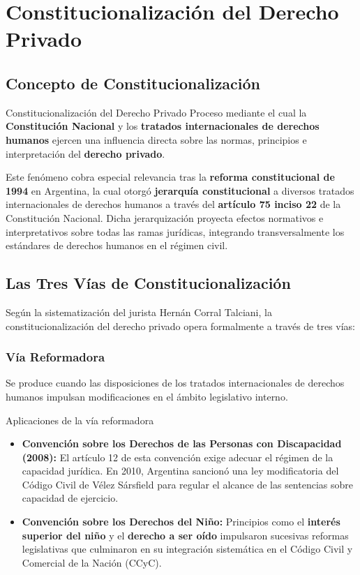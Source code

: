 \documentclass[12pt,oneside]{book}
\begin{document}
\chapter{Constitucionalización del Derecho Privado}

\section{Concepto de Constitucionalización}

\begin{definition}{Constitucionalización del Derecho Privado}
Proceso mediante el cual la \textbf{Constitución Nacional} y los \textbf{tratados internacionales de derechos humanos} ejercen una influencia directa sobre las normas, principios e interpretación del \textbf{derecho privado}.
\end{definition}

Este fenómeno cobra especial relevancia tras la \textbf{reforma constitucional de 1994} en Argentina, la cual otorgó \textbf{jerarquía constitucional} a diversos tratados internacionales de derechos humanos a través del \textbf{artículo 75 inciso 22} de la Constitución Nacional. Dicha jerarquización proyecta efectos normativos e interpretativos sobre todas las ramas jurídicas, integrando transversalmente los estándares de derechos humanos en el régimen civil.

\section{Las Tres Vías de Constitucionalización}

Según la sistematización del jurista Hernán Corral Talciani, la constitucionalización del derecho privado opera formalmente a través de tres vías:

\subsection{Vía Reformadora}
Se produce cuando las disposiciones de los tratados internacionales de derechos humanos impulsan modificaciones en el ámbito legislativo interno.

\begin{example}{Aplicaciones de la vía reformadora}
\begin{itemize}
    \item \textbf{Convención sobre los Derechos de las Personas con Discapacidad (2008):} El artículo 12 de esta convención exige adecuar el régimen de la capacidad jurídica. En 2010, Argentina sancionó una ley modificatoria del Código Civil de Vélez Sársfield para regular el alcance de las sentencias sobre capacidad de ejercicio.
    \item \textbf{Convención sobre los Derechos del Niño:} Principios como el \textbf{interés superior del niño} y el \textbf{derecho a ser oído} impulsaron sucesivas reformas legislativas que culminaron en su integración sistemática en el Código Civil y Comercial de la Nación (CCyC).
\end{itemize}
\end{example}
\end{document}
